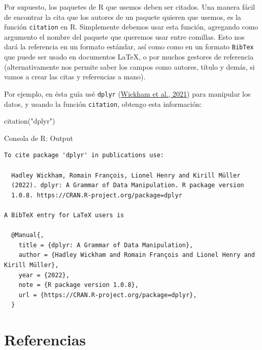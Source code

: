 \documentclass[
  bookmarksnumbered]{article}
\newenvironment{Shaded}{\begin{snugshade}}{\end{snugshade}}
\newcommand{\FunctionTok}[1]{\textcolor[rgb]{0.39,0.29,0.61}{#1}}
\newcommand{\NormalTok}[1]{\textcolor[rgb]{0.12,0.11,0.11}{#1}}
\newcommand{\StringTok}[1]{\textcolor[rgb]{0.75,0.01,0.01}{#1}}
\begin{document}
Por supuesto, los paquetes de R que usemos deben ser citados. Una manera fácil de encontrar la cita que los autores de un paquete quieren que usemos, es la función \texttt{citation} en R. Simplemente debemos usar esta función, agregando como argumento el nombre del paquete que queremos usar entre comillas. Esto nos dará la referencia en un formato estándar, así como como en un formato \texttt{BibTex} que puede ser usado en documentos \LaTeX, o por muchos gestores de referencia (alternativamente nos permite saber los campos como autores, título y demás, si vamos a crear las citas y referencias a mano).

Por ejemplo, en ésta guía usé \texttt{dplyr} (\protect\hyperlink{ref-WickhamDplyr2021}{Wickham et al., 2021}) para manipular los datos, y usando la función \texttt{citation}, obtengo esta información:

\begin{Shaded}
\begin{Highlighting}[]
\FunctionTok{citation}\NormalTok{(}\StringTok{"dplyr"}\NormalTok{)}
\end{Highlighting}
\end{Shaded}

\begin{ROut}{Consola de R: Output~\thetcbcounter}
                \begin{footnotesize}
                \begin{verbatim} 
To cite package 'dplyr' in publications use:

  Hadley Wickham, Romain François, Lionel Henry and Kirill Müller
  (2022). dplyr: A Grammar of Data Manipulation. R package version
  1.0.8. https://CRAN.R-project.org/package=dplyr

A BibTeX entry for LaTeX users is

  @Manual{,
    title = {dplyr: A Grammar of Data Manipulation},
    author = {Hadley Wickham and Romain François and Lionel Henry and Kirill Müller},
    year = {2022},
    note = {R package version 1.0.8},
    url = {https://CRAN.R-project.org/package=dplyr},
  }
 \end{verbatim}
                \end{footnotesize}
                \end{ROut}

\newpage

\hypertarget{referencias}{%
\section*{Referencias}\label{referencias}}
\end{document}
